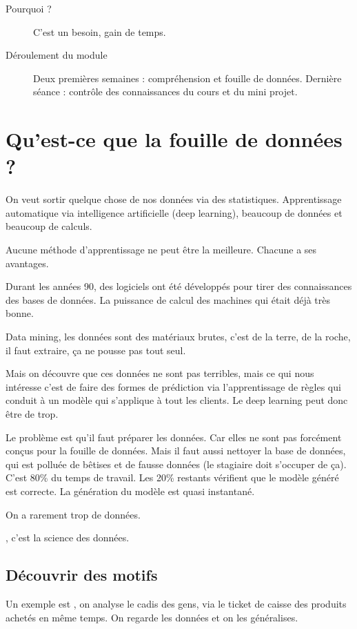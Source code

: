 





\begin{description}
    \item[Pourquoi ?]
    C'est un besoin, gain de temps.
    
    \item[Déroulement du module]
    Deux premières semaines : compréhension et fouille de données.
    Dernière séance : contrôle des connaissances du cours et du mini projet.
\end{description}


\section{Qu'est-ce que la fouille de données ?}
On veut sortir quelque chose de nos données via des statistiques. Apprentissage automatique via intelligence artificielle (deep learning), beaucoup de données et beaucoup de calculs.

Aucune méthode d'apprentissage ne peut être la meilleure. Chacune a ses avantages.

Durant les années 90, des logiciels ont été développés pour tirer des connaissances des bases de données. La puissance de calcul des machines qui était déjà très bonne.

Data mining, les données sont des matériaux brutes, c'est de la terre, de la roche, il faut extraire, ça ne pousse pas tout seul.

Mais on découvre que ces données ne sont pas terribles, mais ce qui nous intéresse c'est de faire des formes de prédiction via l'apprentissage de règles qui conduit à un modèle qui s'applique à tout les clients. Le deep learning peut donc être de trop.

Le problème est qu'il faut préparer les données. Car elles ne sont pas forcément conçus pour la fouille de données. Mais il faut aussi nettoyer la base de données, qui est polluée de bêtises et de fausse données (le stagiaire doit s'occuper de ça). C'est 80\% du temps de travail. Les 20\% restants vérifient que le modèle généré est correcte. La génération du modèle est quasi instantané.

On a rarement trop de données.

, c'est la science des données.

\subsection{Découvrir des motifs}
Un exemple est , on analyse le cadis des gens, via le ticket de caisse des produits achetés en même temps. On regarde les données et on les généralises.

